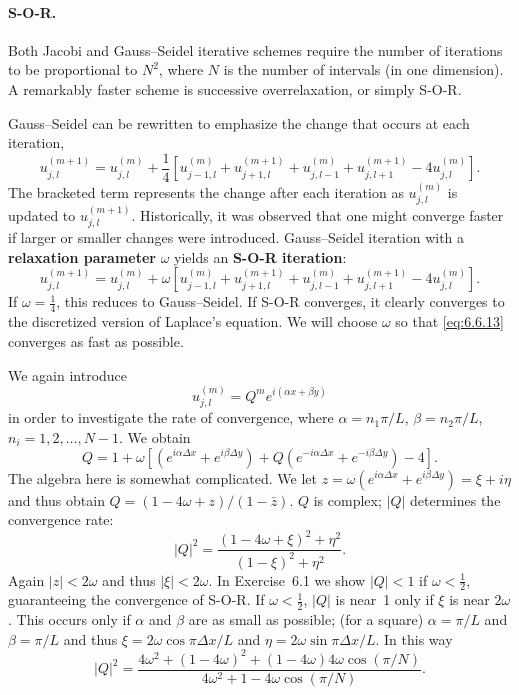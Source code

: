 \paragraph{S-O-R.}
Both Jacobi and Gauss--Seidel iterative schemes require the number of iterations to be proportional to $N^2$, where $N$ is the number of intervals (in one dimension).  A remarkably faster scheme is successive overrelaxation, or simply S-O-R.

Gauss--Seidel can be rewritten to emphasize the change that occurs at each iteration,
\[
u_{j,l}^{(m+1)} = u_{j,l}^{(m)} + \frac{1}{4}\left[u_{j-1,l}^{(m)} + u_{j+1,l}^{(m+1)} + u_{j,l-1}^{(m)} + u_{j,l+1}^{(m+1)} - 4u_{j,l}^{(m)}\right].
\]
The bracketed term represents the change after each iteration as $u_{j,l}^{(m)}$ is updated to $u_{j,l}^{(m+1)}$.  Historically, it was observed that one might converge faster if larger or smaller changes were introduced.  Gauss--Seidel iteration with a \textbf{relaxation parameter} $\omega$ yields an \textbf{S-O-R iteration}:
\begin{equation}
\boxed{u_{j,l}^{(m+1)} = u_{j,l}^{(m)} + \omega\left[u_{j-1,l}^{(m)} + u_{j+1,l}^{(m+1)} + u_{j,l-1}^{(m)} + u_{j,l+1}^{(m+1)} - 4u_{j,l}^{(m)}\right].}
\label{eq:6.6.13}
\end{equation}
If $\omega = \frac{1}{4}$, this reduces to Gauss--Seidel.  If S-O-R converges, it clearly converges to the discretized version of Laplace's equation.  We will choose $\omega$ so that \eqref{eq:6.6.13} converges as fast as possible.

We again introduce
\[
u_{j,l}^{(m)} = Q^m e^{i(\alpha x + \beta y)}
\]
in order to investigate the rate of convergence, where $\alpha = n_1\pi/L$, $\beta = n_2\pi/L$, $n_i = 1, 2, \ldots, N-1$.  We obtain
\[
Q = 1 + \omega\left[(e^{i\alpha\Delta x} + e^{i\beta\Delta y}) + Q(e^{-i\alpha\Delta x} + e^{-i\beta\Delta y}) - 4\right].
\]
The algebra here is somewhat complicated.  We let $z = \omega\left(e^{i\alpha\Delta x} + e^{i\beta\Delta y}\right) = \xi + i\eta$ and thus obtain $Q = (1 - 4\omega + z)/(1 - \bar{z})$.  $Q$ is complex; $|Q|$ determines the convergence rate:
\[
|Q|^2 = \frac{(1 - 4\omega + \xi)^2 + \eta^2}{(1-\xi)^2 + \eta^2}.
\]
Again $|z| < 2\omega$ and thus $|\xi| < 2\omega$.  In Exercise~6.1 we show $|Q| < 1$ if $\omega < \frac{1}{2}$, guaranteeing the convergence of S-O-R.  If $\omega < \frac{1}{2}$, $|Q|$ is near~1 only if $\xi$ is near $2\omega$.  This occurs only if $\alpha$ and $\beta$ are as small as possible; (for a square) $\alpha = \pi/L$ and $\beta = \pi/L$ and thus $\xi = 2\omega\cos\pi\Delta x/L$ and $\eta = 2\omega\sin\pi\Delta x/L$.  In this way
\[
|Q|^2 = \frac{4\omega^2 + (1-4\omega)^2 + (1-4\omega)4\omega\cos(\pi/N)}{4\omega^2 + 1 - 4\omega\cos(\pi/N)}.
\]

